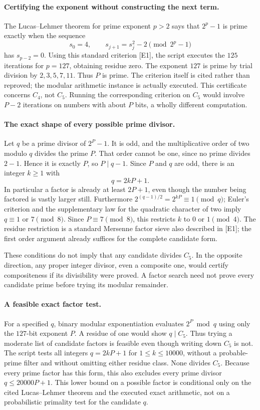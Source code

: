 \documentclass[11pt,a4paper]{article}
\begin{document}
\paragraph{Certifying the exponent without constructing the next term.}
The Lucas--Lehmer theorem for prime exponent $p>2$ says that $2^p-1$
is prime exactly when the sequence
\[
 s_0=4,\qquad s_{j+1}=s_j^2-2\pmod{2^p-1}
\]
has $s_{p-2}=0$. Using this standard criterion [E1], the script executes
the $125$ iterations for $p=127$, obtaining residue zero. The exponent
$127$ is prime by trial division by $2,3,5,7,11$. Thus $P$ is prime.
The criterion itself is cited rather than reproved; the modular
arithmetic instance is actually executed. This certificate concerns
$C_4$, not $C_5$. Running the corresponding criterion on $C_5$ would
involve $P-2$ iterations on numbers with about $P$ bits, a wholly
different computation.

\paragraph{The exact shape of every possible prime divisor.}
Let $q$ be a prime divisor of $2^P-1$. It is odd, and the multiplicative
order of two modulo $q$ divides the prime $P$. That order cannot be one,
since no prime divides $2-1$. Hence it is exactly $P$, so $P\mid q-1$.
Since $P$ and $q$ are odd, there is an integer $k\ge1$ with
\[
                         q=2kP+1.
\]
In particular a factor is already at least $2P+1$, even though the
number being factored is vastly larger still. Furthermore
$2^{(q-1)/2}=2^{kP}\equiv1\pmod q$; Euler's criterion and the
supplementary law for the quadratic character of two imply
$q\equiv1$ or $7\pmod8$. Since $P\equiv7\pmod8$, this restricts
$k$ to $0$ or $1\pmod4$. The residue restriction is a standard Mersenne
factor sieve also described in [E1]; the first order argument already
suffices for the complete candidate form.

These conditions do not imply that any candidate divides $C_5$.
In the opposite direction, any proper integer divisor, even a composite
one, would certify compositeness if its divisibility were proved. A
factor search need not prove every candidate prime before trying its
modular remainder.

\paragraph{A feasible exact factor test.}
For a specified $q$, binary modular exponentiation evaluates
$2^P\bmod q$ using only the $127$-bit exponent $P$. A residue of one
would show $q\mid C_5$. Thus trying a moderate list of candidate
factors is feasible even though writing down $C_5$ is not.
The script tests all integers $q=2kP+1$ for $1\le k\le10000$, without
a probable-prime filter and without omitting either residue class.
None divides $C_5$. Because every prime factor has this form, this
also excludes every prime divisor $q\le20000P+1$.
This lower bound on a possible factor is conditional only on the cited
Lucas--Lehmer theorem and the executed exact arithmetic, not on a
probabilistic primality test for the candidate $q$.
\end{document}
